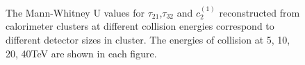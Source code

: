 \begin{figure}
\begin{center}
\end{center}
\caption{The Mann-Whitney U values for $\tau_{21}$,$\tau_{32}$ and $c_2^{(1)}$ reconstructed from calorimeter clusters at different collision energies correspond to different detector sizes in cluster. The energies of collision at 5, 10, 20, 40TeV are shown in each figure.}
\label{fig:cluster_U_summary}
\end{figure}


